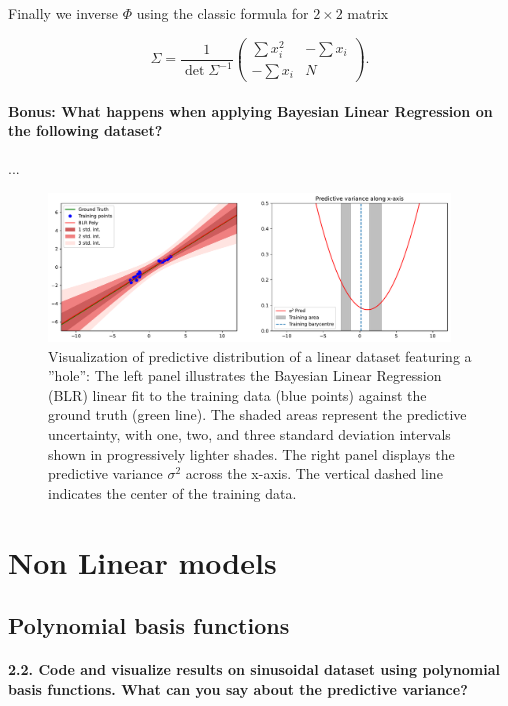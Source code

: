 Finally we inverse $ \Phi  $ using the classic formula for $ 2 \times 2 $ matrix 

\[
    \Sigma = \frac{1}{\det \Sigma ^{-1}} \begin{pmatrix}
        \sum x_i^2 & - \sum x_i \\
        - \sum x_i & N
    \end{pmatrix}
    .\]

\paragraph*{Bonus: What happens when applying Bayesian Linear Regression on the following dataset?}

...

\begin{figure}[H]
    \centering
    \includegraphics[width=0.95\textwidth]{phi_linear_hole.pdf}
    \caption{Visualization of predictive distribution of a linear dataset featuring a ''hole'': The left panel illustrates the Bayesian Linear Regression (BLR) linear fit to the training data (blue points) against the ground truth (green line). The shaded areas represent the predictive uncertainty, with one, two, and three standard deviation intervals shown in progressively lighter shades. The right panel displays the predictive variance $\sigma^2$ across the x-axis. The vertical dashed line indicates the center of the training data.    }
    \label{fig:phi_linear_hole}
\end{figure}

\section{Non Linear models}

\subsection{Polynomial basis functions}

\paragraph*{2.2. Code and visualize results on sinusoidal dataset using polynomial basis functions. What can you say about the predictive variance?}

